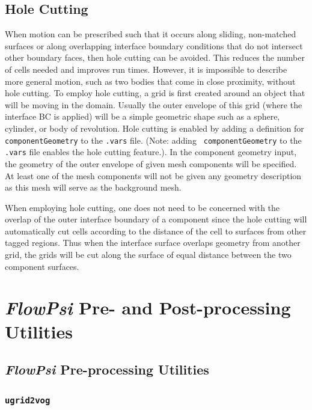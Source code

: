 \documentclass{article}
\begin{document}
\subsection{Hole Cutting}

When motion can be prescribed such that it occurs along sliding,
non-matched surfaces or along overlapping interface boundary
conditions that do not intersect other boundary faces, then hole
cutting can be avoided.  This reduces the number of cells needed and
improves run times.  However, it is impossible to describe more
general motion, such as two bodies that come in close proximity,
without hole cutting.  To employ hole cutting, a grid is first created
around an object that will be moving in the domain.  Usually the outer
envelope of this grid (where the interface BC is applied) will be a
simple geometric shape such as a sphere, cylinder, or body of
revolution.  Hole cutting is enabled by adding a definition for {\tt
  componentGeometry} to the {\tt .vars} file. (Note: adding {\tt
  componentGeometry} to the {\tt .vars} file enables the hole cutting
feature.).  In the component geometry input, the geometry of the outer
envelope of given mesh components will be specified.  At least one of
the mesh components will not be given any geometry description as this
mesh will serve as the background mesh.

When employing hole cutting, one does not need to be concerned
with the overlap of the outer interface boundary of a component since
the hole cutting will automatically cut cells according to the
distance of the cell to surfaces from other tagged regions.  Thus
when the interface surface overlaps geometry from another grid, the
grids will be cut along the surface of equal distance between the two
component surfaces.


\section{{\em FlowPsi} Pre- and Post-processing Utilities}

\subsection{{\em FlowPsi} Pre-processing Utilities}

\subsubsection{\tt ugrid2vog}
\end{document}
